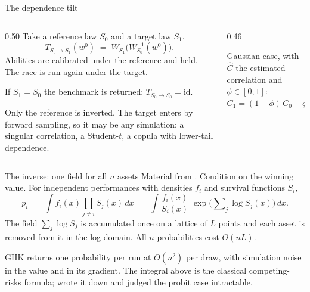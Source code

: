 \documentclass[aspectratio=169,11pt]{beamer}
\begin{document}
\begin{frame}{The dependence tilt}
\begin{columns}[T,onlytextwidth]
\begin{column}{0.50\textwidth}\setlength{\parskip}{0.5em}
Take a reference law $S_0$ and a target law $S_1$.
\[
  T_{S_0\to S_1}(w^0) \;=\; W_{S_1}\!\big(W_{S_0}^{-1}(w^0)\big).
\]
Abilities are calibrated under the reference and held. The race is run again
under the target.

If $S_1 = S_0$ the benchmark is returned: $T_{S_0\to S_0}=\mathrm{id}$.

Only the reference is inverted. The target enters by forward sampling, so it
may be any simulation: a singular correlation, a Student-$t$, a copula with
lower-tail dependence.
\end{column}
\begin{column}{0.46\textwidth}
\centering
{}

\medskip
\raggedright
Gaussian case, with $\widehat C$ the estimated correlation and
$\phi\in[0,1]$:
\[
  C_1 = (1-\phi)\,C_0 + \phi\,\widehat C .
\]
\end{column}
\end{columns}
\end{frame}

\begin{frame}{The inverse: one field for all $n$ assets}
Material from \textcite{cotton2021,cotton2026inversion}. Condition on the winning
value. For independent performances with densities $f_i$ and survival functions
$S_i$,
\[
  p_i \;=\; \int f_i(x)\prod_{j\ne i} S_j(x)\,dx
      \;=\; \int \frac{f_i(x)}{S_i(x)}\;
            \exp\!\Big(\sum\nolimits_{j}\log S_j(x)\Big)\,dx .
\]
The field $\sum_j \log S_j$ is accumulated once on a lattice of $L$ points and
each asset is removed from it in the log domain. All $n$ probabilities cost
$O(nL)$.

GHK returns one probability per run at $O(n^2)$ per draw, with simulation noise
in the value and in its gradient. The integral above is the classical
competing-risks formula; \textcite{domencich1975} wrote it down and judged the
probit case intractable.
\end{frame}
\end{document}
